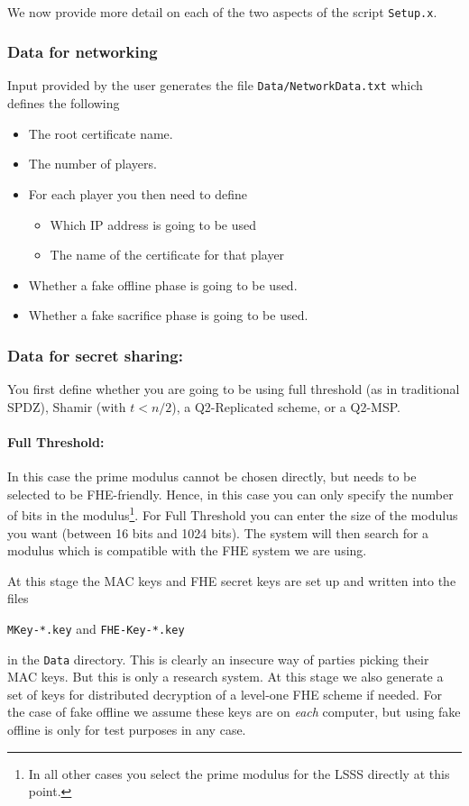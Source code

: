 ~~

\noindent We now provide more detail on each of the two aspects of the script
\verb+Setup.x+.

\subsubsection{Data for networking}
Input provided by the user generates the file
\verb+Data/NetworkData.txt+ which defines the following
\begin{itemize}
\item The root certificate name.
\item The number of players.
\item For each player you then need to define
\begin{itemize}
  \item Which IP address is going to be used
  \item The name of the certificate for that player
\end{itemize}
\item Whether a fake offline phase is going to be used.
\item Whether a fake sacrifice phase is going to be used.
\end{itemize}

\subsubsection{Data for secret sharing:}
You first define whether you are going to be using full threshold (as in
traditional SPDZ), Shamir (with $t<n/2$), a Q2-Replicated scheme, or 
a Q2-MSP.

\paragraph{Full Threshold:}
In this case the prime modulus cannot be chosen directly, but
needs to be selected to be FHE-friendly. Hence, in this case you
can only specify the number of bits in the modulus\footnote{In all
other cases you select the prime modulus for the LSSS directly
at this point.}.
For Full Threshold you can enter the size of the modulus you want (between 16 bits
and 1024 bits).  The system will then
search for a modulus which is compatible with the FHE system we are
using.

At this stage the MAC keys and FHE secret keys are set up and written into the
files 
\begin{center}
\verb+MKey-*.key+ and \verb+FHE-Key-*.key+ 
\end{center}
in the \verb+Data+ directory. 
This is clearly an insecure way of parties picking their MAC keys. But this is only a
research system. 
At this stage we also generate a set of keys
for distributed decryption of a level-one FHE scheme if needed.
For the case of fake offline we assume these keys are on {\em each} computer,
but using fake offline is only for test purposes in any case.

